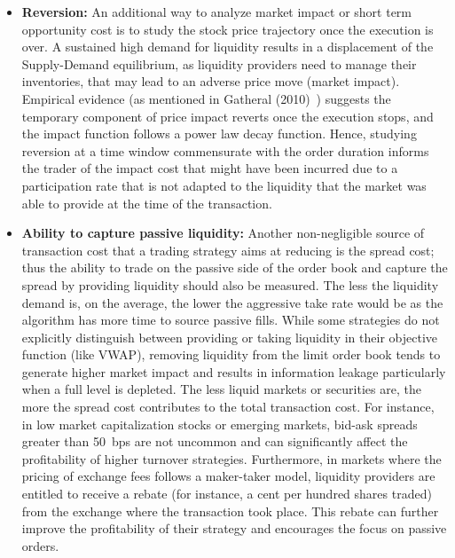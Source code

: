 \begin{itemize}
\item \textbf{Reversion:} An additional way to analyze market impact or short term opportunity cost is to study the stock price trajectory once the execution is over. A sustained high demand for liquidity results in a displacement of the Supply-Demand equilibrium, as liquidity providers need to manage their inventories, that may lead to an adverse price move (market impact). Empirical evidence (as mentioned in Gatheral (2010)~\cite{gatheral}) suggests the temporary component of price impact reverts once the execution stops, and the impact function follows a power law decay function. Hence, studying reversion at a time window commensurate with the order duration informs the trader of the impact cost that might have been incurred due to a participation rate that is not adapted to the liquidity that the market was able to provide at the time of the transaction.

\item \textbf{Ability to capture passive liquidity:} Another non-negligible source of transaction cost that a trading strategy aims at reducing is the spread cost; thus the ability to trade on the passive side of the order book and capture the spread by providing liquidity should also be measured. The less the liquidity demand is, on the average, the lower the aggressive take rate would be as the algorithm has more time to source passive fills. While some strategies do not explicitly distinguish between providing or taking liquidity in their objective function (like VWAP), removing liquidity from the limit order book tends to generate higher market impact and results in information leakage particularly when a full level is depleted. The less liquid markets or securities are, the more the spread cost contributes to the total transaction cost. For instance, in low market capitalization stocks or emerging markets, bid-ask spreads greater than 50~bps are not uncommon and can significantly affect the profitability of higher turnover strategies.  Furthermore, in markets where the pricing of exchange fees follows a maker-taker model, liquidity providers are entitled to receive a rebate (for instance, a cent per hundred shares traded) from the exchange where the transaction took place. This rebate can further improve the profitability of their strategy and encourages the focus on passive orders. 


\end{itemize}
